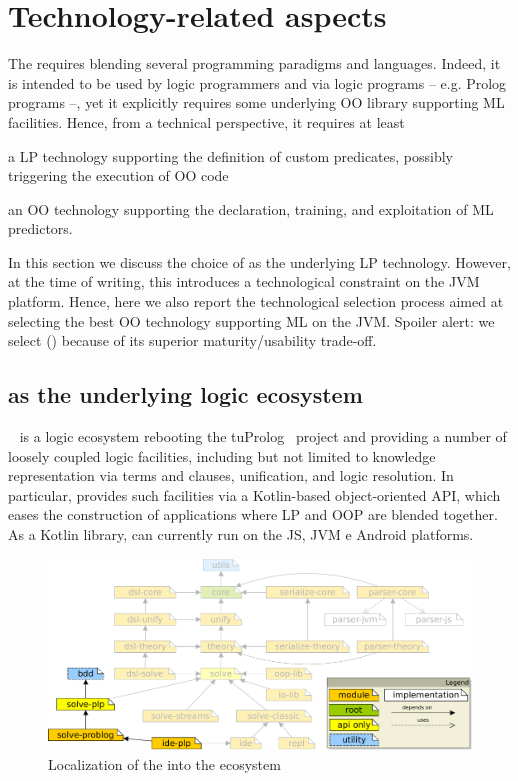 \documentclass[12pt,a4paper,openright,twoside]{book}
\begin{document}
\section{Technology-related aspects}
\label{sec:tech}

The \mllib{} requires blending several programming paradigms and languages.
%
Indeed, it is intended to be used by logic programmers and via logic programs -- e.g. Prolog programs --, yet it explicitly requires some underlying OO library supporting ML facilities.
%
Hence, from a technical perspective, it requires at least
%
\begin{inlinelist}
    \item a LP technology supporting the definition of custom predicates, possibly triggering the execution of OO code
    \item an OO technology supporting the declaration, training, and exploitation of ML predictors.
\end{inlinelist}

In this section we discuss the choice of \twopkt{} as the underlying LP technology.
%
However, at the time of writing, this introduces a technological constraint on the JVM platform.
%
Hence, here we also report the technological selection process aimed at selecting the best OO technology supporting ML on the JVM.
%
Spoiler alert: we select \deeplearningforj{} (\dlfj{}) because of its superior maturity/usability trade-off.


\subsection{\twopkt{} as the underlying logic ecosystem}

\twopkt{}~\cite{cco-softwarex-2021-2pkt} is a logic ecosystem rebooting the tuProlog~\cite{tuprolog-padl01} project and providing a number of loosely coupled logic facilities, including but not limited to knowledge representation via terms and clauses, unification, and logic resolution.
%
In particular, \twopkt{} provides such facilities via a Kotlin-based object-oriented API, which eases the construction of applications where LP and OOP are blended together.
%
As a Kotlin library, \twopkt{} can currently run on the JS, JVM e Android platforms.

\begin{figure}
    \centering
    \includegraphics[width=0.8\linewidth]{figures/project-map.pdf}
    \caption{Localization of the \mllib{} into the \twopkt{} ecosystem}
    \label{fig:structure}
\end{figure}
\end{document}
